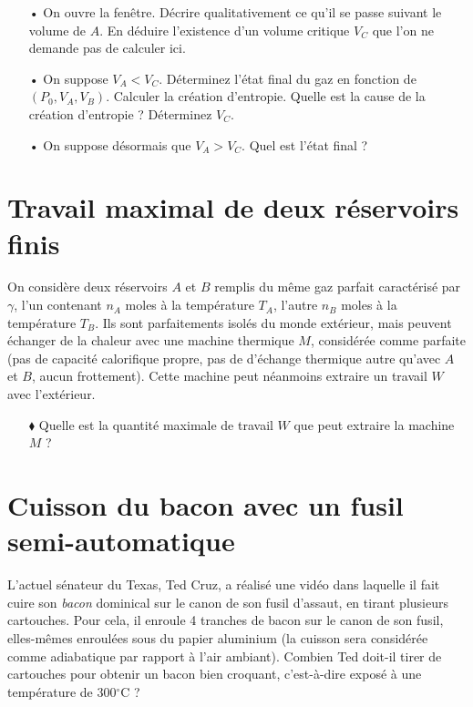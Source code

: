 \documentclass{report}
\begin{document}
\begin{itemize}
\item[•] On ouvre la fenêtre. Décrire qualitativement ce qu'il se passe suivant le volume de $A$. En déduire l'existence d'un volume critique $V_C$ que l'on ne demande pas de calculer ici.

\item[•] On suppose $V_A<V_C$. Déterminez l'état final du gaz en fonction de $(P_0, V_A, V_B)$. Calculer la création d'entropie. Quelle est la cause de la création d'entropie ? Déterminez $V_C$.

\item[•] On suppose désormais que $V_A>V_C$. Quel est l'état final ?

\end{itemize}

\newpage

\section*{Travail maximal de deux réservoirs finis}

On considère deux réservoirs $A$ et $B$ remplis du même gaz parfait caractérisé par $\gamma$, l'un contenant $n_A$ moles à la température $T_A$, l'autre $n_B$ moles à la température $T_B$. Ils sont parfaitements isolés du monde extérieur, mais peuvent échanger de la chaleur avec une machine thermique $M$, considérée comme parfaite (pas de capacité calorifique propre, pas de d'échange thermique autre qu'avec $A$ et $B$, aucun frottement). Cette machine peut néanmoins extraire un travail $W$ avec l'extérieur. 

\begin{itemize}
\item[$\blacklozenge$] Quelle est la quantité maximale de travail $W$ que peut extraire la machine $M$ ?
\end{itemize}

\newpage

\section*{Cuisson du bacon avec un fusil semi-automatique}

L'actuel sénateur du Texas, Ted Cruz, a réalisé une vidéo dans laquelle il fait cuire son \textit{bacon} dominical sur le canon de son fusil d'assaut, en tirant plusieurs cartouches. Pour cela, il enroule 4 tranches de bacon sur le canon de son fusil, elles-mêmes enroulées sous du papier aluminium (la cuisson sera considérée comme adiabatique par rapport à l'air ambiant). Combien Ted doit-il tirer de cartouches pour obtenir un bacon bien croquant, c'est-à-dire exposé à une température de 300$^\circ$C ?
\end{document}
